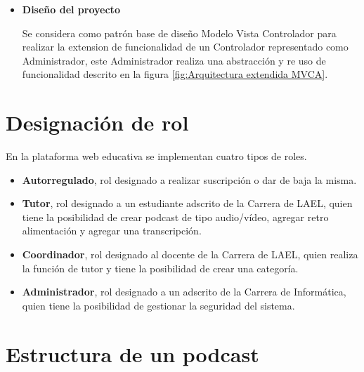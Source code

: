 \begin{itemize}

\item \textbf{Diseño del proyecto}

Se considera como patrón base de diseño Modelo Vista Controlador para realizar
la extension de funcionalidad de un Controlador representado como Administrador,
este Administrador realiza una abstracción y re uso de funcionalidad descrito
en la figura \ref{fig:Arquitectura extendida MVCA}.

\begin{minipage}{1.0\textwidth}
	\centering
	\label{fig:Arquitectura extendida MVCA}
\end{minipage}

\end{itemize}

\section{Designación de rol}

En la plataforma web educativa se implementan cuatro tipos de roles.

\begin{itemize}

\item \textbf{Autorregulado}, rol designado a realizar suscripción o dar de
baja la misma.

\item \textbf{Tutor}, rol designado a un estudiante adscrito de la Carrera de
LAEL, quien tiene la posibilidad de crear podcast de tipo audio/vídeo, agregar
retro alimentación y agregar una transcripción. 

\item \textbf{Coordinador}, rol designado al docente de la Carrera de LAEL, quien
realiza la función de tutor y tiene la posibilidad de crear una categoría.

\item \textbf{Administrador}, rol designado a un adscrito de la Carrera de
Informática, quien tiene la posibilidad de gestionar la seguridad del sistema.

\end{itemize}

\section{Estructura de un podcast} \label{structPodcast}

